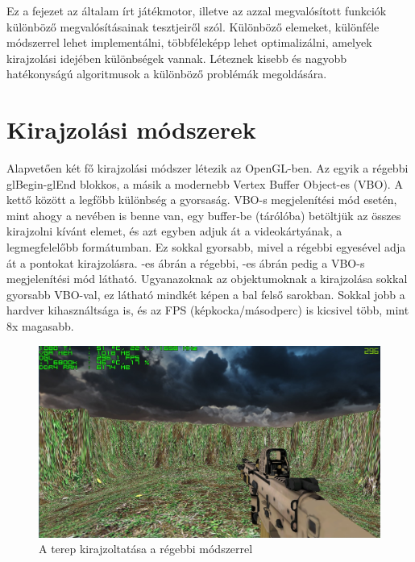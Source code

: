 \label{Chap:tesztek}


Ez a fejezet az általam írt játékmotor, illetve az azzal megvalósított funkciók különböző megvalósításainak tesztjeiről szól. Különböző elemeket, különféle módszerrel lehet implementálni, többféleképp lehet optimalizálni, amelyek kirajzolási idejében különbségek vannak. Léteznek kisebb és nagyobb hatékonyságú algoritmusok a különböző problémák megoldására.

\section{Kirajzolási módszerek}

Alapvetően két fő kirajzolási módszer létezik az OpenGL-ben. Az egyik a régebbi glBegin-glEnd blokkos, a másik a modernebb Vertex Buffer Object-es (VBO). A kettő között a legfőbb különbség a gyorsaság. VBO-s megjelenítési mód esetén, mint ahogy a nevében is benne van, egy buffer-be (tárólóba) betöltjük az összes kirajzolni kívánt elemet, és azt egyben adjuk át a videokártyának, a legmegfelelőbb formátumban. Ez sokkal gyorsabb, mivel a régebbi egyesével adja át a pontokat kirajzolásra. -es ábrán a régebbi, -es  ábrán pedig a VBO-s megjelenítési mód látható. Ugyanazoknak az objektumoknak a kirajzolása sokkal gyorsabb VBO-val, ez látható mindkét képen a bal felső sarokban. Sokkal jobb a hardver kihasználtsága is, és az FPS (képkocka/másodperc) is kicsivel több, mint 8x magasabb.

\begin{figure}[h]
\centering
\includegraphics[scale=0.38]{kepek/old_method_fps.png}
\caption{A terep kirajzoltatása a régebbi módszerrel}
\label{fig:old_fps}
\end{figure}

